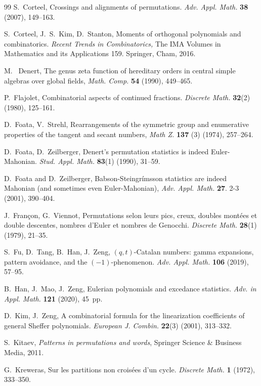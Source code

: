 \documentclass[12pt]{amsart}
\numberwithin{equation}{section}
\theoremstyle{plain}
\theoremstyle{definition}
\begin{document}
\begin{thebibliography}{99}
S.~Corteel, Crossings and alignments of permutations. {\it Adv. Appl. Math.} {\bf 38} (2007), 149--163.

S.~Corteel, J.~S.~Kim, D.~Stanton, Moments of orthogonal polynomials and combinatorics. {\it Recent Trends in Combinatorics,} The IMA Volumes in Mathematics and its Applications 159. Springer, Cham, 2016.

 M. ~Denert, The genus zeta function of hereditary orders in central simple algebras over
global fields, {\it Math. Comp.} {\bf54} (1990), 449--465.

P.~Flajolet, Combinatorial aspects of continued fractions. {\it Discrete Math.} {\bf 32}(2) (1980), 125--161.

 D.~Foata, V.~Strehl, Rearrangements of the symmetric group and enumerative properties of the tangent and secant numbers, \textit{Math Z.} {\bf137} (3) (1974), 257--264.

D.~Foata, D.~Zeilberger, Denert's permutation statistics is indeed Euler-Mahonian. {\it Stud. Appl. Math.} {\bf83}(1) (1990), 31--59.

 D.~Foata and D.~Zeilberger, Babson-Steingr\'{i}msson statistics are indeed Mahonian (and sometimes even Euler-Mahonian), {\it Adv. Appl. Math.} {\bf27}. 2-3 (2001), 390--404.

J.~Fran\c con, G.~Viennot, Permutations selon leurs pics, creux, doubles mont\'ees et double descentes, nombres d'Euler et nombres de Genocchi. {\it Discrete Math.} {\bf28}(1) (1979), 21--35.

S.~Fu, D.~Tang, B.~Han, J.~Zeng, $(q,t)$-Catalan numbers: gamma expansions, pattern avoidance, and the $(-1)$-phenomenon. {\it Adv. Appl. Math.}
{\bf 106} (2019), 57--95.

B.~Han, J.~Mao, J.~Zeng, Eulerian polynomials and excedance statistics. {\it Adv. in Appl. Math.} {\bf 121} (2020), 45~pp.

D.~Kim, J.~Zeng, A combinatorial formula for the linearization coefficients of general Sheffer polynomials. {\it European J. Combin.} {\bf 22}(3) (2001), 313--332.

S.~Kitaev, \emph{Patterns in permutations and words}, Springer Science \& Business Media, 2011.

G.~Kreweras, Sur les partitions non crois\'ees d'un cycle. {\it Discrete Math.} {\bf1} (1972), 333--350.


\end{thebibliography}
\end{document}
